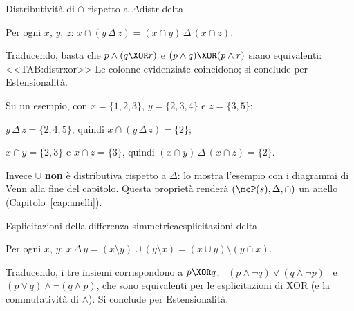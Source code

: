 \begin{concetto}
\begin{Proposizione}{Distributività di $\cap$ rispetto a $\Delta$}{distr-delta}
    \begin{prerequisiti}
    \end{prerequisiti}
    Per ogni $x$, $y$, $z$: \quad $x \cap (y \,\Delta\, z) = (x \cap y) \,\Delta\, (x \cap z)$.
\end{Proposizione}
\begin{dimostrazione}
    Traducendo, basta che $p \wedge (q \XOR r)$ e $(p \wedge q) \XOR (p \wedge r)$ siano equivalenti:
    <<TAB:distrxor>>
    Le colonne evidenziate coincidono; si conclude per Estensionalità.
\end{dimostrazione}
\end{concetto}

\begin{spiegazione}
    Su un esempio, con $x = \{1, 2, 3\}$, $y = \{2, 3, 4\}$ e $z = \{3, 5\}$:
    \begin{passi}
        \item $y \,\Delta\, z = \{2, 4, 5\}$, quindi $x \cap (y \,\Delta\, z) = \{2\}$;
        \item $x \cap y = \{2, 3\}$ e $x \cap z = \{3\}$, quindi $(x \cap y) \,\Delta\, (x \cap z) = \{2\}$.
    \end{passi}
    Invece $\cup$ \textbf{non} è distributiva rispetto a $\Delta$: lo mostra l'esempio con i diagrammi di Venn alla fine del capitolo. Questa proprietà renderà
    $(\mcP(s), \Delta, \cap)$ un anello (Capitolo~\ref{cap:anelli}).
\end{spiegazione}


\begin{concetto}
\begin{Proposizione}{Esplicitazioni della differenza simmetrica}{esplicitazioni-delta}
    \begin{prerequisiti}
    \end{prerequisiti}
    Per ogni $x$, $y$: \quad $x \,\Delta\, y = (x \setminus y) \cup (y \setminus x) = (x \cup y) \setminus (y \cap x)$.
\end{Proposizione}
\begin{dimostrazione}
    Traducendo, i tre insiemi corrispondono a $p \XOR q$, \ $(p \wedge \neg q) \vee (q \wedge \neg p)$ \ e
    $(p \vee q) \wedge \neg(q \wedge p)$, che sono equivalenti per le esplicitazioni di XOR
    (e la commutatività di $\wedge$). Si conclude per Estensionalità.
\end{dimostrazione}
\end{concetto}

